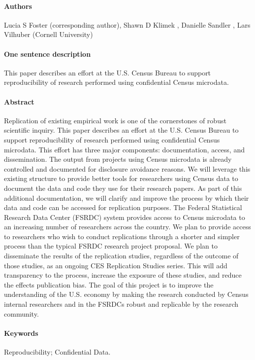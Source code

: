 \paragraph{Authors}  Lucia S Foster  (corresponding author), Shawn D Klimek , Danielle Sandler , Lars Vilhuber  (Cornell University)
\paragraph{One sentence description} This paper describes an effort at the U.S. Census Bureau to support reproducibility of research performed using confidential Census microdata.
\paragraph{Abstract} Replication of existing empirical work is one of the cornerstones of robust scientific inquiry. This paper describes an effort at the U.S. Census Bureau to support reproducibility of research performed using confidential Census microdata. This effort has three major components: documentation, access, and dissemination. The output from projects using Census microdata is already controlled and documented for disclosure avoidance reasons. We will leverage this existing structure to provide better tools for researchers using Census data to document the data and code they use for their research papers. As part of this additional documentation, we will clarify and improve the process by which their data and code can be accessed for replication purposes. The Federal Statistical Research Data Center (FSRDC) system provides access to Census microdata to an increasing number of researchers across the country. We plan to provide access to researchers who wish to conduct replications through a shorter and simpler process than the typical FSRDC research project proposal. We plan to disseminate the results of the replication studies, regardless of the outcome of those studies, as an ongoing CES Replication Studies series. This will add transparency to the process, increase the exposure of these studies, and reduce the effects publication bias. The goal of this project is to improve the understanding of the U.S. economy by making the research conducted by Census internal researchers and in the FSRDCs robust and replicable by the research community.

\paragraph{Keywords} Reproducibility; Confidential Data.